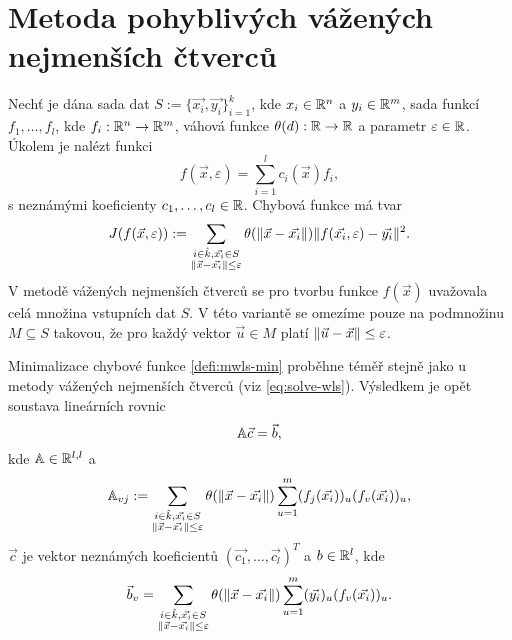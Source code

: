 \section{Metoda pohyblivých vážených nejmenších čtverců}
\label{sec:mwls}

Nechť je dána sada dat $S := \{\vec{x_i}, \vec{y_i}\}_{i = 1}^k$, kde $x_i \in \mathbb{R}^n$ a $y_i \in \mathbb{R}^m$, sada funkcí $f_1,\ldots,f_l$, kde $f_i: \mathbb{R}^n \rightarrow \mathbb{R}^m$, váhová funkce $\theta(d): \mathbb{R} \rightarrow \mathbb{R}$ a parametr $\varepsilon \in \mathbb{R}$. Úkolem je nalézt funkci
\[
  f(\vec{x},\varepsilon) = \sum_{i=1}^lc_i(\vec{x})f_i,
\]
s neznámými koeficienty $c_1, \ldots, c_l \in \mathbb{R}$. Chybová funkce má tvar
\begin{equation}
  \label{defi:mwls-min}
  J(f(\vec{x},\varepsilon)) := \sum_{\substack{i \in \hat k, \vec{x_i} \in S\\\|\vec{x}-\vec{x_i}\| \leq \varepsilon}} \theta(\|\vec{x} - \vec{x_i}\|)\|f(\vec{x_i}, \varepsilon) - \vec{y_i}\|^2.
\end{equation}
V metodě vážených nejmenších čtverců se pro tvorbu funkce $f(\vec{x})$ uvažovala celá množina vstupních dat $S$. V této variantě se omezíme pouze na podmnožinu $M \subseteq S$ takovou, že pro každý vektor $\vec{u} \in M$ platí $\|\vec{u} - \vec{x}\| \leq \varepsilon$.

Minimalizace chybové funkce \ref{defi:mwls-min} proběhne téměř stejně jako u metody vážených nejmenších čtverců (viz \ref{eq:solve-wls}). Výsledkem je opět soustava lineárních rovnic
\begin{equation}
  \label{eq:sle-mwls}
  \mathbb{A}\vec{c} = \vec{b},
\end{equation}
kde $\mathbb{A} \in \mathbb{R}^{l,l}$ a
\begin{equation}
  \label{eq:solve-mwls-lhs}
  \mathbb{A}_{vj} := \sum_{\substack{i \in \hat k, \vec{x_i} \in S\\\|\vec{x}-\vec{x_i}\| \leq \varepsilon}} \theta(\|\vec{x} - \vec{x_i}\|) \sum_{u = 1}^m (f_j(\vec{x_i}))_u (f_v(\vec{x_i}))_u,
\end{equation}
$\vec{c}$ je vektor neznámých koeficientů $(\vec{c_1}, \ldots, \vec{c_l})^T$ a $b \in \mathbb{R}^l$, kde
\begin{equation}
  \label{eq:solve-mwls-rhs}
  \vec{b}_v = \sum_{\substack{i \in \hat k, \vec{x_i} \in S\\\|\vec{x}-\vec{x_i}\| \leq \varepsilon}} \theta(\|\vec{x} - \vec{x_i}\|) \sum_{u=1}^m (\vec{y_i})_u(f_v(\vec{x_i}))_u.
\end{equation}

